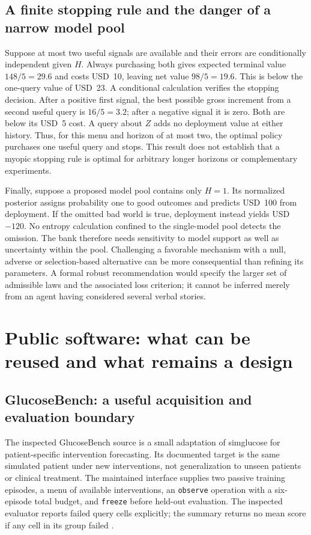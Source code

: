\subsection{A finite stopping rule and the danger of a narrow model pool}

Suppose at most two useful signals are available and their errors are
conditionally independent given $H$. Always purchasing both gives expected
terminal value $148/5=29.6$ and costs USD~10, leaving net value $98/5=19.6$.
This is below the one-query value of USD~23. A conditional calculation verifies
the stopping decision. After a positive first signal, the best possible gross
increment from a second useful query is $16/5=3.2$; after a negative signal
it is zero. Both are below its USD~5 cost. A query about $Z$ adds no deployment
value at either history. Thus, for this menu and horizon of at most two,
the optimal policy purchases one useful query and stops. This result does
not establish that a myopic stopping rule is optimal for arbitrary longer
horizons or complementary experiments.

Finally, suppose a proposed model pool contains only $H=1$. Its normalized
posterior assigns probability one to good outcomes and predicts USD~100 from
deployment. If the omitted bad world is true, deployment instead yields
USD~$-120$. No entropy calculation confined to the single-model pool detects
the omission. The bank therefore needs sensitivity to model support as well
as uncertainty within the pool. Challenging a favorable mechanism with a
null, adverse or selection-based alternative can be more consequential than
refining its parameters. A formal robust recommendation would specify the
larger set of admissible laws and the associated loss criterion; it cannot
be inferred merely from an agent having considered several verbal stories.

\section{Public software: what can be reused and what remains a design}

\subsection{GlucoseBench: a useful acquisition and evaluation boundary}

The inspected GlucoseBench source is a small adaptation of simglucose for
patient-specific intervention forecasting. Its documented target is the same
simulated patient under new interventions, not generalization to unseen
patients or clinical treatment. The maintained interface supplies two passive
training episodes, a menu of available interventions, an \texttt{observe}
operation with a six-episode total budget, and \texttt{freeze} before held-out
evaluation. The inspected evaluator reports failed query cells explicitly;
the summary returns no mean score if any cell in its group failed
\citep{exec13_active_glucosebench}.

